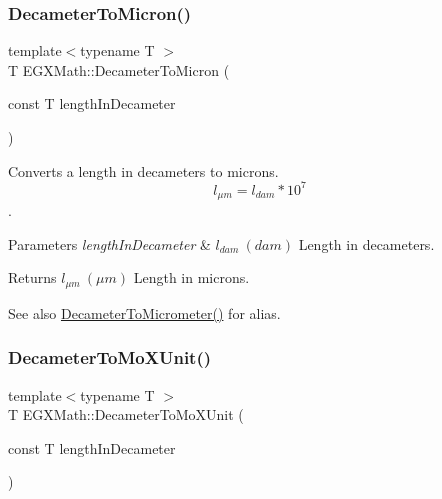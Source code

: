 \subsubsection{\texorpdfstring{Decameter\+To\+Micron()}{DecameterToMicron()}}
{\footnotesize\ttfamily template$<$typename T $>$ \\
T E\+G\+X\+Math\+::\+Decameter\+To\+Micron (\begin{DoxyParamCaption}\item[{const T}]{length\+In\+Decameter }\end{DoxyParamCaption})}



Converts a length in decameters to microns. \[ l_{\mu m}=l_{dam} * 10^{7} \]. 


\begin{DoxyParams}{Parameters}
{\em length\+In\+Decameter} & $ l_{dam}\ (dam)$ Length in decameters. \\
\hline
\end{DoxyParams}
\begin{DoxyReturn}{Returns}
$ l_{\mu m}\ (\mu m)$ Length in microns. 
\end{DoxyReturn}
\begin{DoxySeeAlso}{See also}
\mbox{\hyperlink{group___e_g_x_math-_conversions-_length_conversions-_s_i-_decameter-_s_i_gaa5b6d3a32a921345aa1ccb66a8df07c1}{Decameter\+To\+Micrometer()}} for alias. 
\end{DoxySeeAlso}
\mbox{\label{group___e_g_x_math-_conversions-_length_conversions-_s_i-_decameter-_non-_s_i_ga9e345feeb2568ded9fdceaf1d23d0ca6}} 
\subsubsection{\texorpdfstring{Decameter\+To\+Mo\+X\+Unit()}{DecameterToMoXUnit()}}
{\footnotesize\ttfamily template$<$typename T $>$ \\
T E\+G\+X\+Math\+::\+Decameter\+To\+Mo\+X\+Unit (\begin{DoxyParamCaption}\item[{const T}]{length\+In\+Decameter }\end{DoxyParamCaption})}



